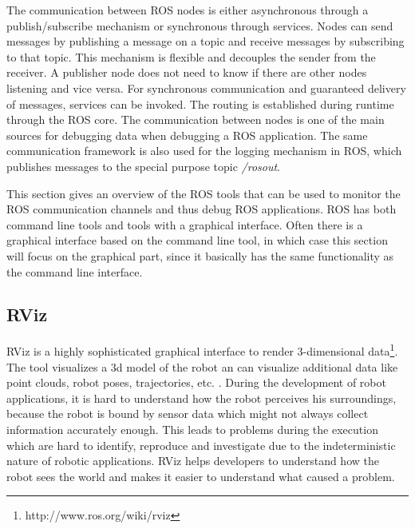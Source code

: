 The communication between ROS nodes is either asynchronous through a publish/subscribe mechanism or synchronous through services. Nodes can send messages by publishing a message on a topic and receive messages by subscribing to that topic. This mechanism is flexible and decouples the sender from the receiver. A publisher node does not need to know if there are other nodes listening and vice versa. For synchronous communication and guaranteed delivery of messages, services can be invoked. The routing is established during runtime through the ROS core. The communication between nodes is one of the main sources for debugging data when debugging a ROS application. The same communication framework is also used for the logging mechanism in ROS, which publishes messages to the special purpose topic \emph{/rosout}.

This section gives an overview of the ROS tools that can be used to monitor the ROS communication channels and thus debug ROS applications. ROS has both command line tools and tools with a graphical interface. Often there is a graphical interface based on the command line tool, in which case this section will focus on the graphical part, since it basically has the same functionality as the command line interface.


\subsection{RViz}
RViz is a highly sophisticated graphical interface to render 3-dimensional data\footnote{http://www.ros.org/wiki/rviz}. The tool visualizes a 3d model of the robot an can visualize additional data like point clouds, robot poses, trajectories, etc. \cite{Quigley2009}. During the development of robot applications, it is hard to understand how the robot perceives his surroundings, because the robot is bound by sensor data which might not always collect information accurately enough. This leads to problems during the execution which are hard to identify, reproduce and investigate due to the indeterministic nature of robotic applications. RViz helps developers to understand how the robot sees the world and makes it easier to understand what caused a problem.

